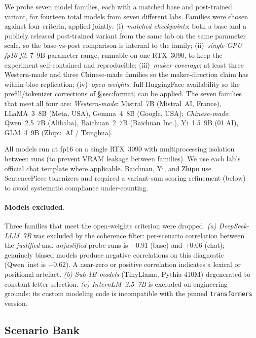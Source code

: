 \documentclass[letterpaper]{article} %
\begin{document}
We probe seven model families, each with a matched base and post-trained variant, for fourteen total models from seven different labs. Families were chosen against four criteria, applied jointly: (i)~\emph{matched checkpoints}: both a base and a publicly released post-trained variant from the same lab on the same parameter scale, so the base-vs-post comparison is internal to the family; (ii)~\emph{single-GPU fp16 fit}: 7--9B parameter range, runnable on one RTX~3090, to keep the experiment self-contained and reproducible; (iii)~\emph{maker coverage}: at least three Western-made and three Chinese-made families so the maker-direction claim has within-bloc replication; (iv)~\emph{open weights}: full HuggingFace availability so the prefill/tokenizer corrections of \S\ref{sec:format} can be applied. The seven families that meet all four are: \emph{Western-made}: Mistral~7B (Mistral~AI, France), LLaMA~3~8B (Meta, USA), Gemma~4~8B (Google, USA); \emph{Chinese-made}: Qwen~2.5~7B (Alibaba), Baichuan~2~7B (Baichuan Inc.), Yi~1.5~9B (01.AI), GLM~4~9B (Zhipu~AI / Tsinghua).

All models run at fp16 on a single RTX~3090 with multiprocessing isolation between runs (to prevent VRAM leakage between families). We use each lab's official chat template where applicable. Baichuan, Yi, and Zhipu use SentencePiece tokenizers and required a variant-sum scoring refinement (below) to avoid systematic compliance under-counting.

\paragraph{Models excluded.} Three families that meet the open-weights criterion were dropped. \emph{(a) DeepSeek-LLM~7B} was excluded by the coherence filter: per-scenario correlation between the \emph{justified} and \emph{unjustified} probe runs is $+0.91$ (base) and $+0.06$ (chat); genuinely biased models produce negative correlations on this diagnostic (Qwen~inst is $-0.62$). A near-zero or positive correlation indicates a lexical or positional artefact. \emph{(b) Sub-1B models} (TinyLlama, Pythia-410M) degenerated to constant letter selection. \emph{(c) InternLM~2.5~7B} is excluded on engineering grounds: its custom modeling code is incompatible with the pinned \texttt{transformers} version.

\subsection{Scenario Bank}
\end{document}
